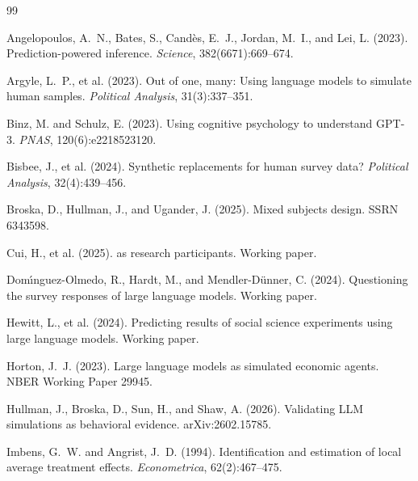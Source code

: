 \documentclass[12pt]{article}
\begin{document}
\begin{thebibliography}{99}

Angelopoulos, A.~N., Bates, S., Cand\`{e}s, E.~J., Jordan, M.~I., and Lei, L. (2023).
\newblock Prediction-powered inference.
\newblock \textit{Science}, 382(6671):669--674.

Argyle, L.~P., et al. (2023).
\newblock Out of one, many: Using language models to simulate human samples.
\newblock \textit{Political Analysis}, 31(3):337--351.

Binz, M. and Schulz, E. (2023).
\newblock Using cognitive psychology to understand {GPT}-3.
\newblock \textit{PNAS}, 120(6):e2218523120.

Bisbee, J., et al. (2024).
\newblock Synthetic replacements for human survey data?
\newblock \textit{Political Analysis}, 32(4):439--456.

Broska, D., Hullman, J., and Ugander, J. (2025).
\newblock Mixed subjects design.
\newblock SSRN 6343598.

Cui, H., et al. (2025).
 as research participants.
\newblock Working paper.

Dom\'{\i}nguez-Olmedo, R., Hardt, M., and Mendler-D\"{u}nner, C. (2024).
\newblock Questioning the survey responses of large language models.
\newblock Working paper.

Hewitt, L., et al. (2024).
\newblock Predicting results of social science experiments using large language models.
\newblock Working paper.

Horton, J.~J. (2023).
\newblock Large language models as simulated economic agents.
\newblock NBER Working Paper 29945.

Hullman, J., Broska, D., Sun, H., and Shaw, A. (2026).
\newblock Validating {LLM} simulations as behavioral evidence.
\newblock arXiv:2602.15785.

Imbens, G.~W. and Angrist, J.~D. (1994).
\newblock Identification and estimation of local average treatment effects.
\newblock \textit{Econometrica}, 62(2):467--475.


\end{thebibliography}
\end{document}

